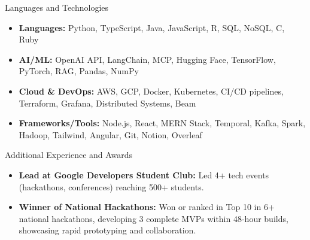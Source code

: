 \documentclass[]{mcdowellcv}
\begin{document}
\begin{cvsection}{Languages and Technologies}
  \begin{cvsubsection}{}{}{}
    \begin{itemize}
      \item \textbf{Languages:} Python, TypeScript, Java, JavaScript, R, SQL, NoSQL, C, Ruby
      \item \textbf{AI/ML:} OpenAI API, LangChain, MCP, Hugging Face, TensorFlow, PyTorch, RAG, Pandas, NumPy
      \item \textbf{Cloud \& DevOps:} AWS, GCP, Docker, Kubernetes, CI/CD pipelines, Terraform, Grafana, Distributed Systems, Beam
      \item \textbf{Frameworks/Tools:} Node.js, React, MERN Stack, Temporal, Kafka, Spark, Hadoop, Tailwind, Angular, Git, Notion, Overleaf
    \end{itemize}
  \end{cvsubsection}
\end{cvsection}

\begin{cvsection}{Additional Experience and Awards}
  \begin{cvsubsection}{}{}{}
    \begin{itemize}
      \item \textbf{Lead at Google Developers Student Club:} Led 4+ tech events (hackathons, conferences) reaching 500+ students.
      \item \textbf{Winner of National Hackathons:} Won or ranked in Top 10 in 6+ national hackathons, developing 3 complete MVPs within 48-hour builds, showcasing rapid prototyping and collaboration.
    \end{itemize}
  \end{cvsubsection}
\end{cvsection}
\end{document}
